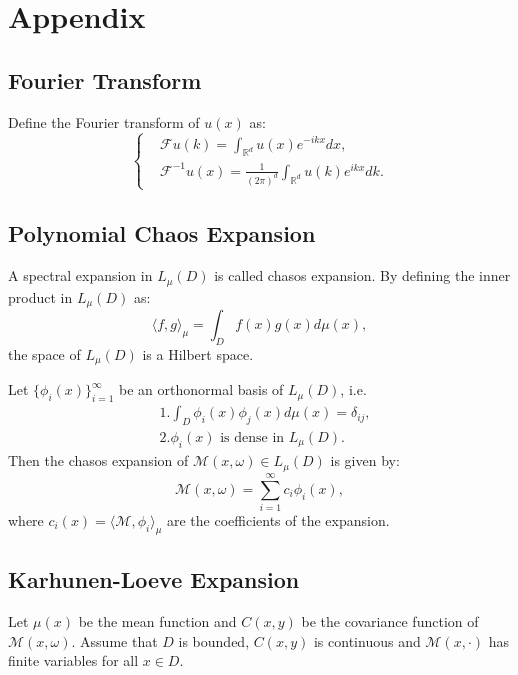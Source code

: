 \chapter{Appendix}

\section{Fourier Transform}\label{FourierTransform}
\begin{definition}
	Define the Fourier transform of $u(x)$ as:
	\begin{equation}\left\{
		\begin{aligned}
			& \mathcal{F}u(k) = \int_{\mathbb{R}^d} u(x) e^{-ikx} dx,\\
			& \mathcal{F}^{-1}u(x) = \frac{1}{(2\pi)^{d}}\int_{\mathbb{R}^d} u(k) e^{ikx} dk.
		\end{aligned}\right.
	\end{equation}
\end{definition}
\section{Polynomial Chaos Expansion}\label{PCE}
A spectral expansion in $L_{\mu}(D)$ is called chasos expansion. By defining the inner product in $L_{\mu}(D)$ as:
\begin{equation}
	\langle f, g \rangle_{\mu} = \int_D f(x) g(x) d\mu(x),
\end{equation}
the space of $L_\mu(D)$ is a Hilbert space.
\begin{theorem}
	Let $\{\phi_i(x)\}_{i=1}^{\infty}$ be an orthonormal basis of $L_\mu(D)$, i.e.
	\begin{equation}
		\begin{aligned}
			&1. \int_D \phi_i(x) \phi_j(x) d\mu(x) = \delta_{ij},\\
			&2. {\phi_i(x)} \text{ is dense in } L_\mu(D).
		\end{aligned}
	\end{equation}
	Then the chasos expansion of $\mathcal{M}(x, \omega)\in L_\mu(D)$ is given by:
	\begin{equation}
		\mathcal{M}(x, \omega) = \sum_{i=1}^{\infty} c_i \phi_i(x),
	\end{equation}
	where $c_i(x)=\langle \mathcal{M}, \phi_i\rangle_{\mu}$ are the coefficients of the expansion.
\end{theorem}
	

\section{Karhunen-Loeve Expansion}\label{KLE}
Let $\mu(x)$ be the mean function and $C(x, y)$ be the covariance function of $\mathcal{M}(x, \omega)$. 
Assume that $D$ is bounded, $C(x, y)$ is continuous and $\mathcal{M}(x, \cdot)$ has finite variables for all $x\in D$.


